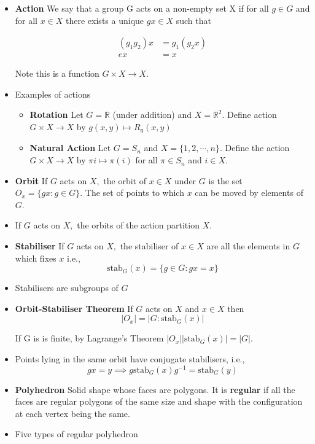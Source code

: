 \documentclass[a4paper, 12pt]
{article}
\newcommand{\stab}[1]{\text{stab}_G(#1)}
\newcommand{\inv}[1]{#1^{-1}}
\begin{document}
	\begin{itemize}
		\item  \textbf{Action} We say that a group G acts on a non-empty set X if for all $g \in G$ and for all $x\in X$ there exists a unique  $gx \in X$ such that 
		
		\begin{align*}
			(g_1g_2)x &= g_1(g_2x)\\
			ex&=x 
		\end{align*}
		
		Note this is a function $G \times X \rightarrow X.$
		
		\item Examples of actions
		\begin{itemize}
			\item \textbf{Rotation} Let $G = \mathbb{R}$ (under addition) and $X = \mathbb{R}^2.$ Define action $G \times X \rightarrow X$ by $g(x,y) \mapsto R_g(x,y)$
			
			\item \textbf{Natural Action} Let $G =S_n$ and $X = \{1,2, \cdots,n\}.$ Define the action $G \times X \rightarrow X$ by $\pi i \mapsto \pi (i)$ for all $\pi \in S_n$ and $i \in X.$
		\end{itemize}
		
	\item \textbf{Orbit} If $G$ acts on $X,$ the orbit of $x \in X$ under $G$ is the set $O_x = \{gx: g \in G\}.$ The set of points to which $x$ can be moved by elements of $G.$
	
	\item If $G$ acts on $X,$ the orbits of the action partition $X.$

 	\item \textbf{Stabiliser} If $G$ acts on $X,$ the stabiliser of $x \in X$ are all the elements in $G$ which fixes $x$ i.e.,
 	$$\stab{x}= \{g \in G: gx=x\}$$
 	
 	\item Stabilisers are subgroups of $G$
 	
 	\item \textbf{Orbit-Stabiliser Theorem} If $G$ acts on $X$ and $x \in X$ then $$|O_x| = |G: \stab{x}|$$
 	
 	If G is is finite, by Lagrange's Theorem $|O_x||\stab{x}|= |G|.$
 	
 	\item  Points lying in the same orbit have conjugate stabilisers, i.e., $$gx=y \implies g\stab{x}\inv{g} = \stab{y}$$
	
	\item \textbf{Polyhedron} Solid shape whose faces are polygons. It is \textbf{regular} if all the faces are regular polygons of the same size and shape with the configuration at each vertex being the same.
	
	\item Five types of regular polyhedron
 	 \end{itemize}
 	
\end{document}
